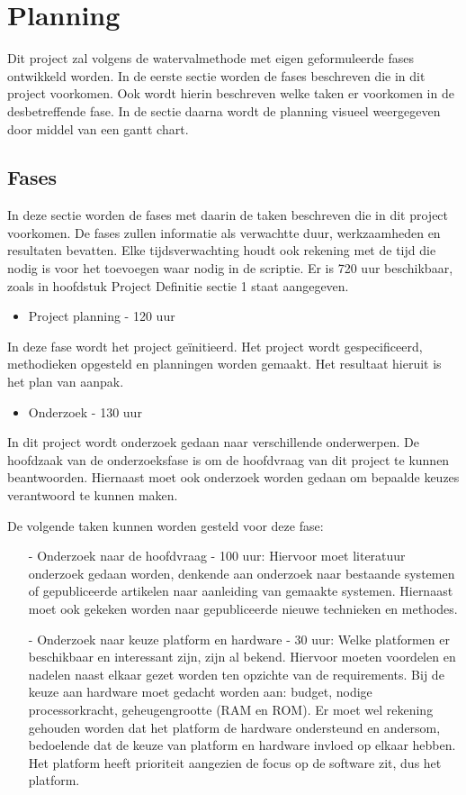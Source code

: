 \documentclass{../local}
\begin{document}
\section{Planning}
Dit project zal volgens de watervalmethode met eigen geformuleerde fases ontwikkeld worden. In de eerste sectie worden de fases beschreven die in dit project voorkomen. Ook wordt hierin beschreven welke taken er voorkomen in de desbetreffende fase. In de sectie daarna wordt de planning visueel weergegeven door middel van een gantt chart.

\subsection{Fases}
In deze sectie worden de fases met daarin de taken beschreven die in dit project voorkomen. De fases zullen informatie als verwachtte duur, werkzaamheden en resultaten bevatten. Elke tijdsverwachting houdt ook rekening met de tijd die nodig is voor het toevoegen waar nodig in de scriptie. Er is 720 uur beschikbaar, zoals in hoofdstuk Project Definitie sectie 1 staat aangegeven.

\begin{itemize}
\item Project planning - 120 uur
\end{itemize}
In deze fase wordt het project geïnitieerd. Het project wordt gespecificeerd, methodieken opgesteld en planningen worden gemaakt. Het resultaat hieruit is het plan van aanpak.

\begin{itemize}
\item Onderzoek - 130 uur
\end{itemize}
In dit project wordt onderzoek gedaan naar verschillende onderwerpen. De hoofdzaak van de onderzoeksfase is om de hoofdvraag van dit project te kunnen beantwoorden. Hiernaast moet ook onderzoek worden gedaan om bepaalde keuzes verantwoord te kunnen maken.

De volgende taken kunnen worden gesteld voor deze fase:
\begin{itemize}
\item[-] Onderzoek naar de hoofdvraag - 100 uur: Hiervoor moet literatuur onderzoek gedaan worden, denkende aan onderzoek naar bestaande systemen of gepubliceerde artikelen naar aanleiding van gemaakte systemen. Hiernaast moet ook gekeken worden naar gepubliceerde nieuwe technieken en methodes. 

\item[-] Onderzoek naar keuze platform en hardware - 30 uur: Welke platformen er beschikbaar en interessant zijn, zijn al bekend. Hiervoor moeten voordelen en nadelen naast elkaar gezet worden ten opzichte van de requirements. Bij de keuze aan hardware moet gedacht worden aan: budget, nodige processorkracht, geheugengrootte (RAM en ROM). Er moet wel rekening gehouden worden dat het platform de hardware ondersteund en andersom, bedoelende dat de keuze van platform en hardware invloed op elkaar hebben. Het platform heeft prioriteit aangezien de focus op de software zit, dus het platform.
\end{itemize}
\end{document}
